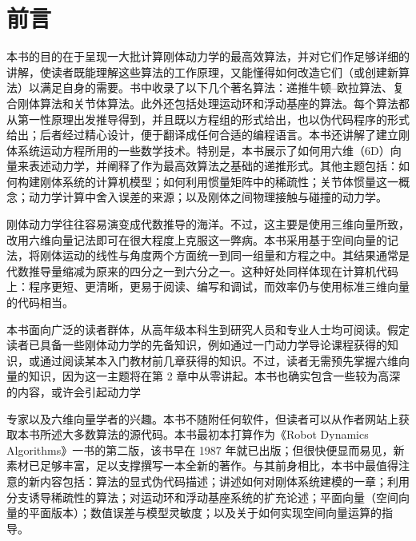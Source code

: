 \chapter*{前言}
本书的目的在于呈现一大批计算刚体动力学的最高效算法，并对它们作足够详细的讲解，使读者既能理解这些算法的工作原理，又能懂得如何改造它们（或创建新算法）以满足自身的需要。书中收录了以下几个著名算法：递推牛顿–欧拉算法、复合刚体算法和关节体算法。此外还包括处理运动环和浮动基座的算法。每个算法都从第一性原理出发推导得到，并且既以方程组的形式给出，也以伪代码程序的形式给出；后者经过精心设计，便于翻译成任何合适的编程语言。本书还讲解了建立刚体系统运动方程所用的一些数学技术。特别是，本书展示了如何用六维（6D）向量来表述动力学，并阐释了作为最高效算法之基础的递推形式。其他主题包括：如何构建刚体系统的计算机模型；如何利用惯量矩阵中的稀疏性；关节体惯量这一概念；动力学计算中舍入误差的来源；以及刚体之间物理接触与碰撞的动力学。

刚体动力学往往容易演变成代数推导的海洋。不过，这主要是使用三维向量所致，改用六维向量记法即可在很大程度上克服这一弊病。本书采用基于空间向量的记法，将刚体运动的线性与角度两个方面统一到同一组量和方程之中。其结果通常是代数推导量缩减为原来的四分之一到六分之一。这种好处同样体现在计算机代码上：程序更短、更清晰，更易于阅读、编写和调试，而效率仍与使用标准三维向量的代码相当。

本书面向广泛的读者群体，从高年级本科生到研究人员和专业人士均可阅读。假定读者已具备一些刚体动力学的先备知识，例如通过一门动力学导论课程获得的知识，或通过阅读某本入门教材前几章获得的知识。不过，读者无需预先掌握六维向量的知识，因为这一主题将在第 2 章中从零讲起。本书也确实包含一些较为高深的内容，或许会引起动力学

专家以及六维向量学者的兴趣。本书不随附任何软件，但读者可以从作者网站上获取本书所述大多数算法的源代码。本书最初本打算作为《Robot Dynamics Algorithms》一书的第二版，该书早在 1987 年就已出版；但很快便显而易见，新素材已足够丰富，足以支撑撰写一本全新的著作。与其前身相比，本书中最值得注意的新内容包括：算法的显式伪代码描述；讲述如何对刚体系统建模的一章；利用分支诱导稀疏性的算法；对运动环和浮动基座系统的扩充论述；平面向量（空间向量的平面版本）；数值误差与模型灵敏度；以及关于如何实现空间向量运算的指导。

